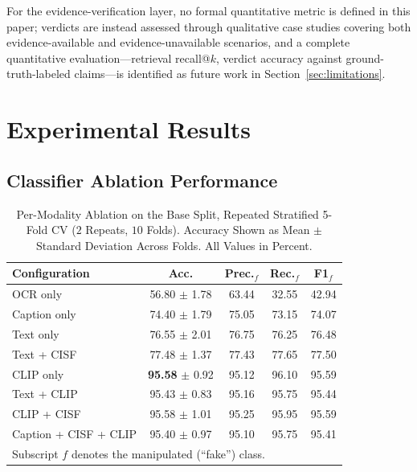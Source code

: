 \documentclass[conference,a4paper]{IEEEtran}
\begin{document}
For the evidence-verification layer, no formal quantitative metric is defined
in this paper; verdicts are instead assessed through qualitative case studies
covering both evidence-available and evidence-unavailable scenarios, and a
complete quantitative evaluation---retrieval recall@$k$, verdict accuracy
against ground-truth-labeled claims---is identified as future work in
Section~\ref{sec:limitations}.

\section{Experimental Results}

\subsection{Classifier Ablation Performance}
\label{sec:ablation}

\begin{table}[t]
\caption{Per-Modality Ablation on the Base Split, Repeated Stratified 5-Fold
CV ($2$ Repeats, $10$ Folds). Accuracy Shown as Mean $\pm$ Standard Deviation
Across Folds. All Values in Percent.}
\label{tab:ablation}
\centering
\setlength{\tabcolsep}{3.5pt}
\begin{tabular}{lcccc}
\toprule
\textbf{Configuration} & \textbf{Acc.} & \textbf{Prec.$_{f}$} &
\textbf{Rec.$_{f}$} & \textbf{F1$_{f}$} \\
\midrule
OCR only              & 56.80 $\pm$ 1.78 & 63.44 & 32.55 & 42.94 \\
Caption only          & 74.40 $\pm$ 1.79 & 75.05 & 73.15 & 74.07 \\
Text only             & 76.55 $\pm$ 2.01 & 76.75 & 76.25 & 76.48 \\
Text + CISF           & 77.48 $\pm$ 1.37 & 77.43 & 77.65 & 77.50 \\
\midrule
CLIP only             & \textbf{95.58} $\pm$ 0.92 & 95.12 & 96.10 & 95.59 \\
Text + CLIP           & 95.43 $\pm$ 0.83 & 95.16 & 95.75 & 95.44 \\
CLIP + CISF           & 95.58 $\pm$ 1.01 & 95.25 & 95.95 & 95.59 \\
Caption + CISF + CLIP & 95.40 $\pm$ 0.97 & 95.10 & 95.75 & 95.41 \\
\bottomrule
\multicolumn{5}{l}{\footnotesize Subscript $f$ denotes the manipulated
(``fake'') class.}
\end{tabular}
\end{table}
\end{document}

